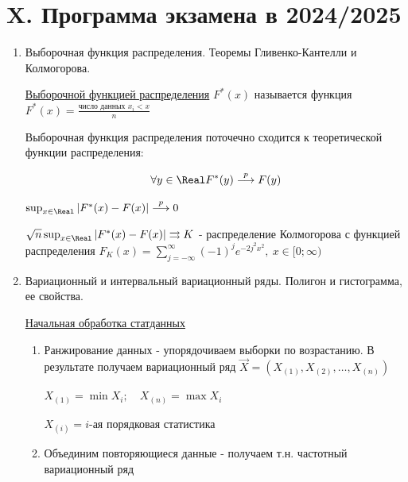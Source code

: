 \clearpage

\section{X. Программа экзамена в 2024/2025}


\begin{enumerate}
    \item Выборочная функция распределения. Теоремы Гливенко-Кантелли и Колмогорова.

    \Def \hyperlink{selective_distribution_function}{Выборочной функцией распределения} $F^*(x)$ называется функция $F^*(x) = \frac{\text{число данных } x_i < x}{n}$

    \begin{MyTheorem}
        \Ths Выборочная функция распределения поточечно сходится к теоретической функции распределения:

        \[\forall y \in \Real F^*(y) \overset{p}{\longrightarrow} F(y)\]
    \end{MyTheorem}

    \begin{MyTheorem}
         $\sup_{x \in \Real} |F^*(x) - F(x)| \overset{p}{\longrightarrow} 0$
    \end{MyTheorem}

    \begin{MyTheorem}
         $\sqrt{n} \sup_{x \in \Real} |F^*(x) - F(x)| \rightrightarrows K$ - распределение Колмогорова с 
        функцией распределения $F_K(x) = \sum_{j = -\infty}^{\infty} (-1)^j e^{-2 j^2 x^2}, \ x \in [0;\infty)$
    \end{MyTheorem}

    \item Вариационный и интервальный вариационный ряды. Полигон и гистограмма, ее свойства.

        
    \hyperlink{initial_data_processing}{Начальная обработка статданных}

    \begin{enumerate}
        \item Ранжирование данных - упорядочиваем выборки по возрастанию. В результате получаем вариационный ряд $\vec{X} = (X_{(1)}, X_{(2)}, \dots, X_{(n)})$

        $X_{(1)} = \min X_i; \quad X_{(n)} = \max X_i$

        $X_{(i)} = i$-ая порядковая статистика

        \item Объединим повторяющиеся данные - получаем т.н. частотный вариационный ряд


\end{enumerate}
\end{enumerate}
